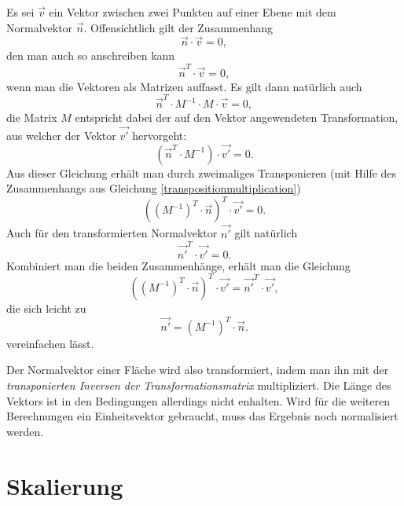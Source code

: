Es sei $\vec v$ ein Vektor zwischen zwei Punkten auf einer Ebene mit dem Normalvektor $\vec n$. Offensichtlich gilt der Zusammenhang
\begin{equation}
 \vec n \cdot \vec v = 0,
\end{equation}
den man auch so anschreiben kann
\begin{equation}
 \vec{n}^T \cdot \vec{v} = 0,
\end{equation}
wenn man die Vektoren als Matrizen auffasst.  Es gilt dann natürlich auch
\begin{equation}
 \vec{n}^T \cdot M^{-1} \cdot M \cdot \vec{v} = 0,
\end{equation}
die Matrix $M$ entspricht dabei der auf den Vektor angewendeten Transformation, aus welcher der Vektor $\vec{v'}$ hervorgeht:
\begin{equation}
 \left( \vec{n}^T \cdot M^{-1} \right) \cdot \vec{v'} = 0.
\end{equation}
Aus dieser Gleichung erhält man durch zweimaliges Transponieren (mit Hilfe des Zusammenhangs aus Gleichung \ref{transpositionmultiplication})
\begin{equation}
 \left( \left( M^{-1} \right)^T \cdot \vec{n} \right)^T \cdot \vec{v'} = 0.
\end{equation}
Auch für den transformierten Normalvektor $\vec{n'}$ gilt natürlich
\begin{equation}
 \vec{n'}^T \cdot \vec{v'} = 0.
\end{equation}
Kombiniert man die beiden Zusammenhänge, erhält man die Gleichung
\begin{equation}
 \left( \left( M^{-1} \right)^T \cdot \vec{n} \right)^T \cdot \vec{v'} = \vec{n'}^T \cdot \vec{v'},
\end{equation}
die sich leicht zu
\begin{equation}
 \vec{n'} = \left( M^{-1} \right)^T \cdot \vec{n}.
\end{equation}
vereinfachen lässt.

Der Normalvektor einer Fläche wird also transformiert, indem man ihn mit der \emph{transponierten Inversen der Transformationsmatrix} multipliziert. Die Länge des Vektors ist in den Bedingungen allerdings nicht enhalten. Wird für die weiteren Berechnungen ein Einheitsvektor gebraucht, muss das Ergebnis noch normalisiert werden.

\section{Skalierung}
\label{scaling}

